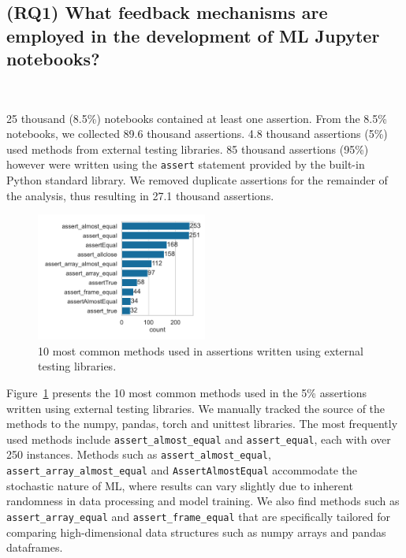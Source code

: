 \subsection{(RQ1) What feedback mechanisms are employed in the development of ML Jupyter notebooks?}~\label{sec:result-analysis}


25 thousand (8.5\%) notebooks contained at least one assertion. From the 8.5\% notebooks, we collected 89.6 thousand assertions. 4.8 thousand assertions (5\%) used methods from external testing libraries. 85 thousand assertions (95\%) however were written using the \lstinline{assert} statement provided by the built-in Python standard library. We removed duplicate assertions for the remainder of the analysis, thus resulting in 27.1 thousand assertions.

\begin{figure}
  \centering
  \includegraphics[width=0.5\textwidth]{other-test-methods.pdf}
  \caption{10 most common methods used in assertions written using external testing libraries.}
  \label{fig:other-test-methods}
\end{figure}

Figure~\ref{fig:other-test-methods} presents the 10 most common methods used in the 5\% assertions written using external testing libraries. We manually tracked the source of the methods to the numpy, pandas, torch and unittest libraries. The most frequently used methods include \lstinline{assert_almost_equal} and \lstinline{assert_equal}, each with over 250 instances. Methods such as \lstinline{assert_almost_equal}, \lstinline{assert_array_almost_equal} and \lstinline{AssertAlmostEqual} accommodate the stochastic nature of ML, where results can vary slightly due to inherent randomness in data processing and model training. We also find methods such as \lstinline{assert_array_equal} and \lstinline{assert_frame_equal} that are specifically tailored for comparing high-dimensional data structures such as numpy arrays and pandas dataframes.

